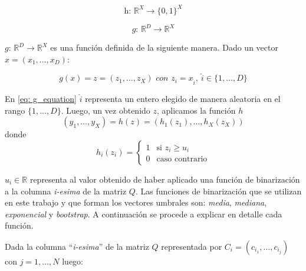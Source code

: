 	$$\textit{h: }\mathbb{R}^{X} \rightarrow \{ 0, 1\}^{X}$$
	
	$$\textit{g: }\mathbb{R}^{D} \rightarrow \mathbb{R}^{X}$$
	
	
	$\textit{g: }\mathbb{R}^{D} \rightarrow \mathbb{R}^{X}$ es una función definida de la siguiente manera. Dado un vector  $x=(x_1, \dots, x_D)$:

	\begin{equation}
	\label{eq: g_equation}
		g(x) = z = (z_1,\dots,z_X) \textit{ con } z_i=x_{\hat{i}},~\hat{i} \in \{1,\dots,D\}
	\end{equation}		
	
	En \ref{eq: g_equation} $\hat{i}$ representa un entero elegido de manera aleatoria en el rango $\{1,\dots,D\}$. Luego, un vez obtenido $z$, aplicamos la función $h$
	\begin{equation}
	\label{eq: h_equation}
		(y_1,\dots,y_X) = h(z) = (h_1(z_1),\dots,h_X(z_X))
	\end{equation}
	donde
	\[
    		h_{i}(z_i) = 
		\begin{cases}
    			1 & \text{si } z_i \geq u_{i}\\
    			0 & \text{caso contrario}
		\end{cases}
	\]

	$u_{i} \in \mathbb{R}$ representa al valor obtenido de haber aplicado una función de binarización a la columna \textit{i-esima} de la matriz  $Q$. Las funciones de binarización que se utilizan en este trabajo y que forman los vectores umbrales son: \textit{media}, \textit{mediana}, \textit{exponencial} y \textit{bootstrap}. A continuación se procede a explicar en detalle cada función.
	
	Dada la columna ``\textit{i-esima}'' de la matriz $Q$ representada por $C_i = (c_{i_1}, \dots, c_{i_j})$ con $j=1, \dots, N$ luego:

